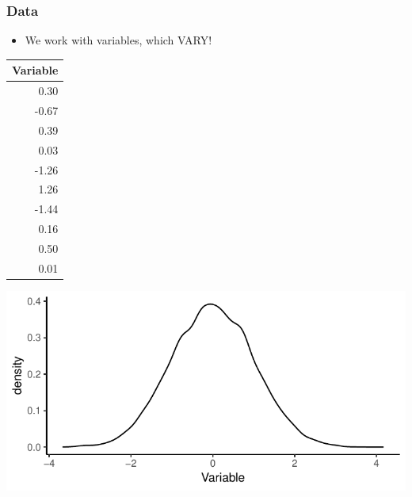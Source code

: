 \documentclass[xcolor=x11names,compress]{beamer}\usepackage[]{graphicx}\usepackage[]{color}
\makeatletter
\def\maxwidth{ %
  \ifdim\Gin@nat@width>\linewidth
    \linewidth
  \else
    \Gin@nat@width
  \fi
}
\newenvironment{knitrout}{}{} %
\renewcommand{\(}{\begin{columns}}
\renewcommand{\)}{\end{columns}}
\newcommand{\<}[1]{\begin{column}{#1}}
\renewcommand{\>}{\end{column}}
\makeatother
\begin{document}
\begin{frame}
\frametitle{Data}
\begin{itemize}
\item We work with variables, which VARY!
\end{itemize}
\begin{multicols}{2}
\begin{table}[ht]
\centering
\begin{tabular}{r}
  \hline
Variable \\ 
  \hline
0.30 \\ 
  -0.67 \\ 
  0.39 \\ 
  0.03 \\ 
  -1.26 \\ 
  1.26 \\ 
  -1.44 \\ 
  0.16 \\ 
  0.50 \\ 
  0.01 \\ 
   \hline
\end{tabular}
\end{table}

\columnbreak
\begin{knitrout}
\color{fgcolor}
\includegraphics[width=\maxwidth]{figure/var2-1} 

\end{knitrout}
\end{multicols}
\end{frame}
\end{document}
